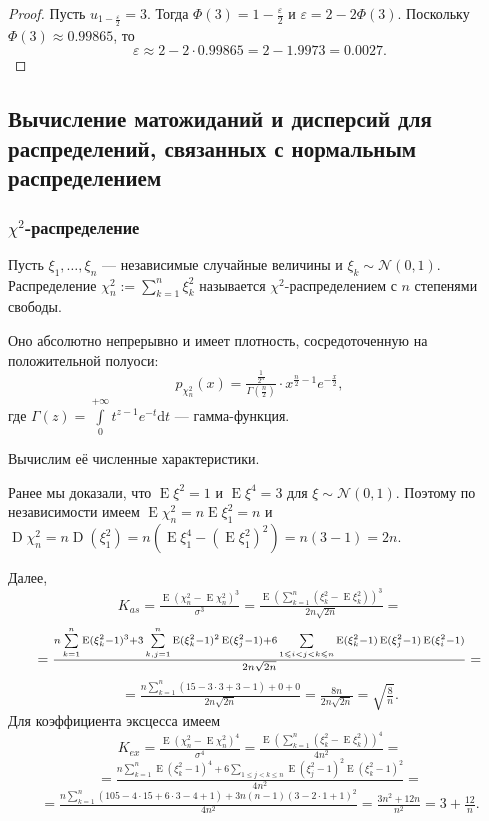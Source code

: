 \documentclass[12pt]{article}
\numberwithin{theorem}{section}
\theoremstyle{definition}
\newcommand{\defin}[2]{\hypertarget{#2}{{\color{red} #1}}}
\newcommand{\expect}{\operatorname{E}}
\newcommand{\disp}{\operatorname{D}}
\newcommand{\diff}{\mathrm{d}}
\begin{document}
	\begin{proof}
		Пусть $ u_{1 - \tfrac{\varepsilon}{2}} = 3 $.
		Тогда $ \Phi(3) = 1 - \tfrac{\varepsilon}{2} $
		и $ \varepsilon = 2 - 2\Phi(3) $.
		Поскольку $ \Phi(3) \approx 0.99865 $, то 
		$$ \varepsilon \approx 2 - 2 \cdot 0.99865
		= 2 - 1.9973 = 0.0027. $$
	\end{proof}
		
	\subsection{Вычисление матожиданий и дисперсий для распределений, связанных с нормальным распределением}
	
	\subsubsection{$ \chi^2 $-распределение}
	
	Пусть $ \xi_1, \ldots, \xi_n $ --- независимые случайные величины и $ \xi_k \sim \mathcal{N}(0, 1) $.
	Распределение $ \chi_n^2 := \sum\limits_{k = 1}^{n} \xi_k^2 $ называется 
	\defin{$ \chi^2 $-распределением с $ n $ степенями свободы}{chi-squared}.
	
	Оно абсолютно непрерывно и имеет плотность, сосредоточенную на положительной полуоси:
	$$ p_{\chi_n^2}(x) = \tfrac{\tfrac{1}{2^n}}{\Gamma(\tfrac{n}{2})} \cdot x^{\tfrac{n}{2} - 1} e^{-\tfrac{x}{2}}, $$
	где $ \Gamma(z) = \int\limits_{0}^{+\infty} t^{z - 1}e^{-t}\diff t $ --- гамма-функция.
	
	Вычислим её численные характеристики.
	
	Ранее мы доказали, что $ \expect\xi^2 = 1 $ и $ \expect\xi^4 = 3 $ для $ \xi \sim \mathcal{N}(0, 1) $.
	Поэтому по независимости имеем $ \expect\chi_n^2 = n\expect\xi_1^2 = n $
	и $ \disp\chi_n^2 = n\disp(\xi_1^2) = n(\expect\xi_1^4 - (\expect\xi_1^2)^2) = n(3 - 1) = 2n $.
	
	Далее, $$ K_{as} = \tfrac{\expect(\chi_n^2 - \expect\chi_n^2)^3}{\sigma^3}
	= \tfrac{\expect(\sum\limits_{k = 1}^{n} (\xi_k^2 - \expect\xi_k^2))^3}{2n\sqrt{2n}} = $$
	$$ = \\ \tfrac{n\sum\limits_{k = 1}^{n} \expect (\xi_k^2 - 1)^3 
		+ 3\sum\limits_{k, j = 1}^{n} \expect (\xi_k^2 - 1)^2\expect(\xi_j^2 - 1)
		+ 6\sum\limits_{1 \leqslant i < j < k \leqslant n} 
		\expect(\xi_k^2 - 1)\expect(\xi_j^2 - 1)\expect(\xi_i^2 - 1)}{2n\sqrt{2n}} = $$
		$$ = \tfrac{n\sum\limits_{k = 1}^{n} (15 - 3\cdot 3 + 3 - 1) + 0 + 0}{2n\sqrt{2n}}
		= \tfrac{8n}{2n\sqrt{2n}} = \sqrt{\tfrac{8}{n}}.
		 $$
	Для коэффициента эксцесса имеем
	$$ K_{ex} = \tfrac{\expect(\chi_n^2 - \expect\chi_n^2)^4}{\sigma^4}
	= \tfrac{\expect(\sum\limits_{k = 1}^{n} (\xi_k^2 - \expect\xi_k^2))^4}{4n^2} = $$
	$$ = \tfrac{n\sum\limits_{k = 1}^{n} \expect (\xi_k^2 - 1)^4
		+ 6\sum\limits_{1 \leqslant j < k \leqslant n} 
		\expect(\xi_j^2 - 1)^2\expect(\xi_k^2 - 1)^2}{4n^2} = $$
	$$ = \tfrac{n\sum\limits_{k = 1}^{n} (105 - 4\cdot 15 + 6\cdot 3 - 4 + 1) 
		+ 3n(n - 1)(3 - 2\cdot1 + 1)^2}{4n^2}
	= \tfrac{3n^2 + 12n}{n^2} = 3 + \tfrac{12}{n}.
	$$
	
\end{document}

